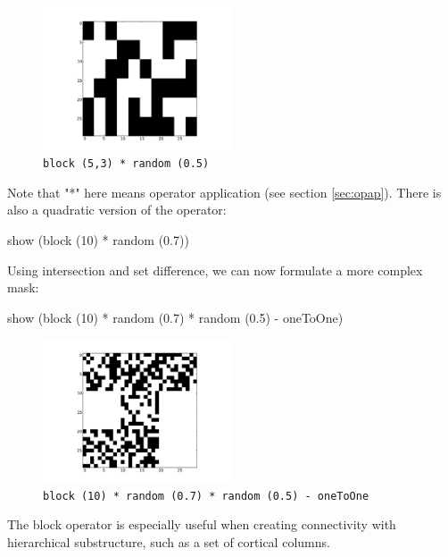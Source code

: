 \documentclass[a4paper,twoside]{report}
\newcommand{\expr}[1]{\lstinline|#1|}
\begin{document}
\begin{figure}
  \begin{center}
    \includegraphics[width=0.5\textwidth]{figures/blockRandom}
    \caption[Block expanded random mask]{\label{fig:blockRandom}
      \expr{block (5,3) * random (0.5)}
    }
  \end{center}
\end{figure}

Note that "*" here means operator application (see section
\ref{sec:opap}).  There is also a quadratic version of the operator:

\begin{code}{}
  show (block (10) * random (0.7))
\end{code}

Using intersection and set difference, we can now formulate a more
complex mask:

\begin{code}{}
  show (block (10) * random (0.7) * random (0.5) - oneToOne)
\end{code}

\begin{figure}
  \begin{center}
    \includegraphics[width=0.5\textwidth]{figures/brro}
    \caption[Random mask]{\label{fig:brro}
      \expr{block (10) * random (0.7) * random (0.5) - oneToOne}
    }
  \end{center}
\end{figure}

The block operator is especially useful when creating connectivity
with hierarchical substructure, such as a set of cortical columns.
\end{document}
